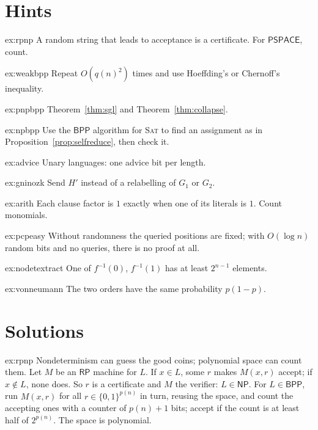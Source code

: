 \section{Hints}

\begin{hint}{ex:rpnp}
A random string that leads to acceptance is a certificate. For $\mathsf{PSPACE}$, count.
\end{hint}
\begin{hint}{ex:weakbpp}
Repeat $O(q(n)^2)$ times and use Hoeffding's or Chernoff's inequality.
\end{hint}
\begin{hint}{ex:pnpbpp}
Theorem~\ref{thm:sgl} and Theorem~\ref{thm:collapse}.
\end{hint}
\begin{hint}{ex:npbpp}
Use the $\mathsf{BPP}$ algorithm for \textup{\textsc{Sat}} to find an assignment as in Proposition~\ref{prop:selfreduce}, then check it.
\end{hint}
\begin{hint}{ex:advice}
Unary languages: one advice bit per length.
\end{hint}
\begin{hint}{ex:gninozk}
Send $H'$ instead of a relabelling of $G_1$ or $G_2$.
\end{hint}
\begin{hint}{ex:arith}
Each clause factor is $1$ exactly when one of its literals is $1$. Count monomials.
\end{hint}
\begin{hint}{ex:pcpeasy}
Without randomness the queried positions are fixed; with $O(\log n)$ random bits and no queries, there is no proof at all.
\end{hint}
\begin{hint}{ex:nodetextract}
One of $f^{-1}(0)$, $f^{-1}(1)$ has at least $2^{n-1}$ elements.
\end{hint}
\begin{hint}{ex:vonneumann}
The two orders have the same probability $p(1-p)$.
\end{hint}

\section{Solutions}

\begin{solution}{ex:rpnp}
\idea Nondeterminism can guess the good coins; polynomial space can count them.
\writeup Let $M$ be an $\mathsf{RP}$ machine for $L$. If $x\in L$, some $r$ makes $M(x,r)$ accept; if $x\notin L$, none does. So $r$ is a certificate and $M$ the verifier: $L\in\mathsf{NP}$. For $L\in\mathsf{BPP}$, run $M(x,r)$ for all $r\in\{0,1\}^{p(n)}$ in turn, reusing the space, and count the accepting ones with a counter of $p(n)+1$ bits; accept if the count is at least half of $2^{p(n)}$. The space is polynomial.
\end{solution}

